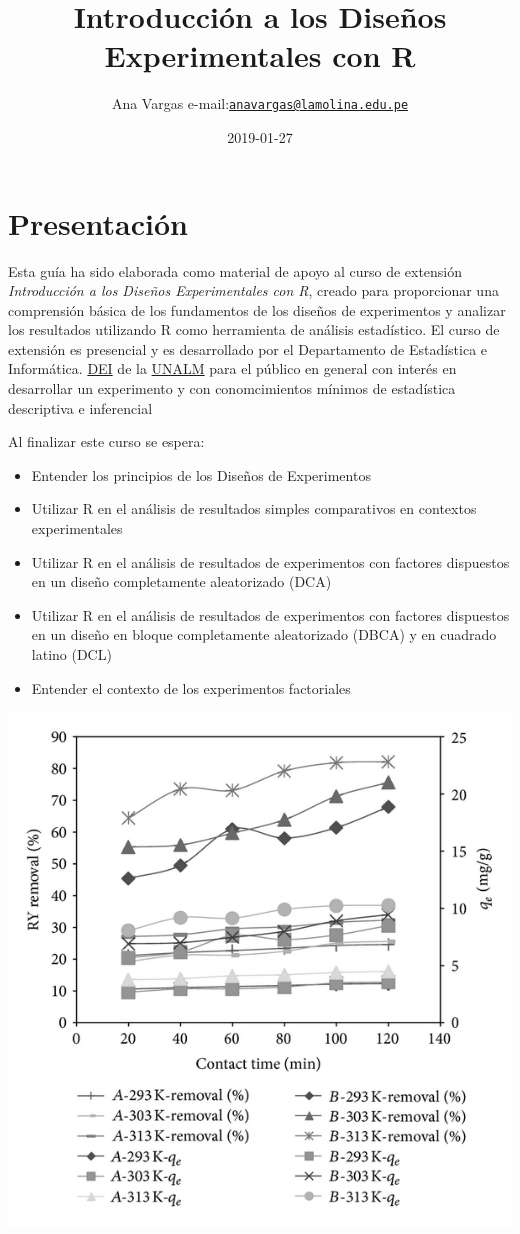 \documentclass[]{book}
\title{Introducción a los Diseños Experimentales con R}
\author{Ana Vargas
e-mail:\href{mailto:anavargas@lamolina.edu.pe}{\nolinkurl{anavargas@lamolina.edu.pe}}}
\date{2019-01-27}
\providecommand{\tightlist}{%
  \setlength{\itemsep}{0pt}\setlength{\parskip}{0pt}}
\begin{document}
\maketitle

{
\setcounter{tocdepth}{1}
\tableofcontents
}
\chapter*{Presentación}\label{presentacion}

Esta guía ha sido elaborada como material de apoyo al curso de extensión
\emph{Introducción a los Diseños Experimentales con R}, creado para
proporcionar una comprensión básica de los fundamentos de los diseños de
experimentos y analizar los resultados utilizando R como herramienta de
análisis estadístico. El curso de extensión es presencial y es
desarrollado por el Departamento de Estadística e Informática.
\href{http://www.lamolina.edu.pe/facultad/economia/index.php/depacaestinf/}{DEI}
de la \href{http://www.lamolina.edu.pe}{UNALM} para el público en
general con interés en desarrollar un experimento y con conomcimientos
mínimos de estadística descriptiva e inferencial

Al finalizar este curso se espera:

\begin{itemize}
\tightlist
\item
  Entender los principios de los Diseños de Experimentos
\item
  Utilizar R en el análisis de resultados simples comparativos en
  contextos experimentales
\item
  Utilizar R en el análisis de resultados de experimentos con factores
  dispuestos en un diseño completamente aleatorizado (DCA)
\item
  Utilizar R en el análisis de resultados de experimentos con factores
  dispuestos en un diseño en bloque completamente aleatorizado (DBCA) y
  en cuadrado latino (DCL)
\item
  Entender el contexto de los experimentos factoriales
\end{itemize}

\begin{center}\includegraphics[width=0.35\linewidth]{imagenes/cover} \end{center}
\end{document}
